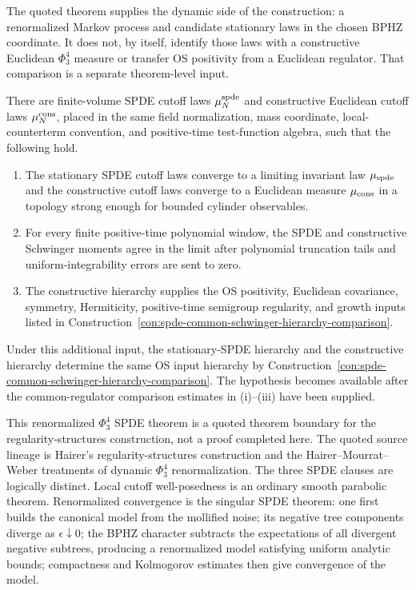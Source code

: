 The quoted theorem supplies the dynamic side of the construction: a
renormalized Markov process and candidate stationary laws in the chosen BPHZ
coordinate.  It does not, by itself, identify those laws with a constructive
Euclidean \(\Phi^4_3\) measure or transfer OS positivity from a Euclidean
regulator.  That comparison is a separate theorem-level input.

\begin{hypothesis}
\label{hyp:phi-four-three-spde-constructive-identification}
There are finite-volume SPDE cutoff laws \(\mu_N^{\rm spde}\) and constructive
Euclidean cutoff laws \(\mu_N^{\rm cons}\), placed in the same field
normalization, mass coordinate, local-counterterm convention, and positive-time
test-function algebra, such that the following hold.
\begin{enumerate}[label=(\roman*)]
\item The stationary SPDE cutoff laws converge to a limiting invariant law
\(\mu_{\rm spde}\) and the constructive cutoff laws converge to a Euclidean
measure \(\mu_{\rm cons}\) in a topology strong enough for bounded cylinder
observables.
\item For every finite positive-time polynomial window, the SPDE and
constructive Schwinger moments agree in the limit after polynomial truncation
tails and uniform-integrability errors are sent to zero.
\item The constructive hierarchy supplies the OS positivity, Euclidean
covariance, symmetry, Hermiticity, positive-time semigroup regularity, and
growth inputs listed in
Construction~\ref{con:spde-common-schwinger-hierarchy-comparison}.
\end{enumerate}
Under this additional input, the stationary-SPDE hierarchy and the
constructive hierarchy determine the same OS input hierarchy by
Construction~\ref{con:spde-common-schwinger-hierarchy-comparison}.  The
hypothesis becomes available after the common-regulator comparison estimates
in (i)--(iii) have been supplied.
\end{hypothesis}

This renormalized \(\Phi^4_3\) SPDE theorem is a quoted theorem boundary for
the regularity-structures construction, not a proof completed here.  The
quoted source lineage is Hairer's regularity-structures construction and the
Hairer--Mourrat--Weber treatments of dynamic \(\Phi^4_3\) renormalization.
The three SPDE clauses are logically distinct.  Local cutoff well-posedness is an
ordinary smooth parabolic theorem.  Renormalized convergence is the singular
SPDE theorem: one first builds the canonical model from the mollified noise;
its negative tree components diverge as \(\epsilon\downarrow0\); the BPHZ
character subtracts the expectations of all divergent negative subtrees,
producing a renormalized model satisfying uniform analytic bounds; compactness
and Kolmogorov estimates then give convergence of the model.

